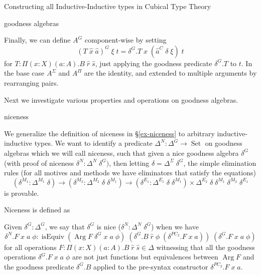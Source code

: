 \documentclass[runningheads]{llncs}
\DeclareMathOperator{\USet}{Set}
\DeclareMathOperator{\isEquiv}{isEquiv}
\DeclareMathOperator{\Arg}{Arg}
\begin{document}
{\begin{section}{Constructing all Inductive-Inductive types in Cubical Type Theory}
\begin{subsection}{goodness algebras}
\begin{definition}
Finally, we can define $A^G$ component-wise by setting \[(T\;\hat{x}\;\hat{a})^G\;\xi\;t = \delta^G.T\;\hat{x}\;(\hat{a}^C\;\delta\;\xi)\;t\] for $T : \Pi(x : X)(a : A).B\;\hat{r}\;\hat{s}$, just applying the goodness predicate $\delta^G.T$ to $t$. In the base case $A^\Sigma$ and $A^\Pi$ are the identity, and extended to multiple arguments by rearranging pairs.

\end{definition}

Next we investigate various properties and operations on goodness algebras.

\end{subsection}
\begin{subsection}{niceness}\label{niceness}

We generalize the definition of niceness in \S\ref{ex-niceness} to arbitrary inductive-inductive types.
We want to identify a predicate $\Delta^N : \Delta^G \to \USet$ on goodness algebras which we will call niceness, such that given a nice goodness algebra $\delta^G$ (with proof of niceness $\delta^N : \Delta^N\;\delta^G)$, then letting $\delta = \Delta^\Sigma\;\delta^G$, the simple elimination rules (for all motives and methods we have eliminators that satisfy the equations)
\[(\delta^{M_1} : \Delta^{M_1}\;\delta) \to (\delta^{M_2} : \Delta^{M_2}\;\delta\;\delta^{M_1}) \to (\delta^{E_1} : \Delta^{E_1}\;\delta\;\delta^{M_1}) \times \Delta^{E_2}\;\delta\;\delta^{M_1}\;\delta^{M_2}\;\delta^{E_1}\] is provable.

Niceness is defined as
\begin{definition}
Given $\delta^G : \Delta^G$, we say that $\delta^G$ is nice ($\delta^N : \Delta^N\;\delta^G$) when we have \[\delta^N.F\;x\;a\;\phi : \isEquiv  (\Arg F\;\delta^G\;x\;a\;\phi)\;(\delta^G.B\;\hat{r}\;\phi\;(\delta^{PC_2}.F\;x\;a))\;(\delta^G.F\;x\;a\;\phi)\] for all operations $F : \Pi(x : X)(a : A).B\;\hat{r}\;\hat{s}\in\Delta$ witnessing that all the goodness operations $\delta^G.F\;x\;a\;\phi$ are not just functions but equivalences between $\Arg F$ and the goodness predicate $\delta^G.B$ applied to the pre-syntax constructor $\delta^{PC_2}.F\;x\;a$.
\end{definition}


\end{subsection}
\end{section}}
\end{document}
